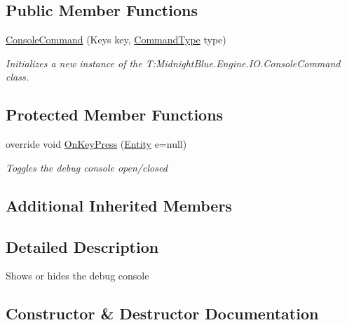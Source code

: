 \subsection*{Public Member Functions}
\begin{DoxyCompactItemize}
\item 
\hyperlink{class_midnight_blue_1_1_engine_1_1_i_o_1_1_console_command_a472e69e9317353ae0a4e9d48911b9c22}{Console\+Command} (Keys key, \hyperlink{namespace_midnight_blue_1_1_engine_1_1_i_o_a8bc3f159399ecadd590f7df1b54354b0}{Command\+Type} type)
\begin{DoxyCompactList}\small\item\em Initializes a new instance of the T\+:\+Midnight\+Blue.\+Engine.\+I\+O.\+Console\+Command class. \end{DoxyCompactList}\end{DoxyCompactItemize}
\subsection*{Protected Member Functions}
\begin{DoxyCompactItemize}
\item 
override void \hyperlink{class_midnight_blue_1_1_engine_1_1_i_o_1_1_console_command_a603fc84ab28db867d9cc5143b95ebcb6}{On\+Key\+Press} (\hyperlink{class_midnight_blue_1_1_engine_1_1_entity_component_1_1_entity}{Entity} e=null)
\begin{DoxyCompactList}\small\item\em Toggles the debug console open/closed \end{DoxyCompactList}\end{DoxyCompactItemize}
\subsection*{Additional Inherited Members}


\subsection{Detailed Description}
Shows or hides the debug console 



\subsection{Constructor \& Destructor Documentation}
\hypertarget{class_midnight_blue_1_1_engine_1_1_i_o_1_1_console_command_a472e69e9317353ae0a4e9d48911b9c22}{}\label{class_midnight_blue_1_1_engine_1_1_i_o_1_1_console_command_a472e69e9317353ae0a4e9d48911b9c22} 
